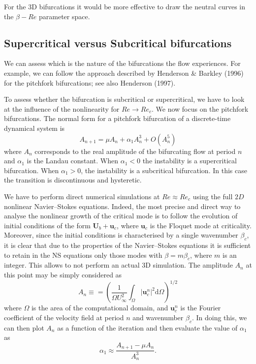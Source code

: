 \documentclass[onecolumn,notitlepage,superscriptaddress, amsmath,amssymb,longbibliographyaps,floatfix]{revtex4-1}
\begin{document}
For the 3D bifurcations it would be more effective to draw the neutral curves in the $\beta-Re$ parameter space.


\subsection{Supercritical versus Subcritical bifurcations}

We can assess which is the nature of the bifurcations the flow experiences. For example, we can follow the approach described by Henderson \& Barkley (1996) for the pitchfork bifurcations; see also Henderson (1997).

To assess whether the bifurcation is subcritical or supercritical, we have to look at the influence of the nonlinearity for $Re \rightarrow Re_c$. We now focus on the pitchfork bifurcations. The normal form for a pitchfork bifurcation of a discrete-time dynamical system is
%
\begin{equation}
  A_{n+1} = \mu A_n + \alpha_1 A_n^3 + O(A_n^5)
\end{equation}
%
where $A_n$ corresponds to the real amplitude of the bifurcating flow at period $n$ and $\alpha_1$ is the Landau constant. When $\alpha_1<0$ the instability is a supercritical bifurcation. When $\alpha_1>0$, the instability is a subcritical bifurcation. In this case the transition is discontinuous and hysteretic.

We have to perform direct numerical simulations at $Re \approx Re_c$ using the full $2D$ nonlinear Navier--Stokes equations. Indeed, the most precise and direct way to analyse the nonlinear growth of the critical mode is to follow the evolution of initial conditions of the form $\bm{U}_b + \bm{u}_c$, where $\bm{u}_c$ is the Floquet mode at criticality. Moreover, since the initial conditions is characterised by a single wavenumber $\beta_c$, it is clear that due to the properties of the Navier--Stokes equations it is sufficient to retain in the NS equations only those modes with $\beta = m \beta_c$, where $m$ is an integer. This allows to not perform an actual 3D simulation.
The amplitude $A_n$ at this point may be simply considered as
%
\begin{equation}
  A_n \equiv =  \left( \frac{1}{\Omega U_\infty^2} \int_{\Omega} |\bm{u}^n_c|^2 \text{d} \Omega \right)^{1/2}
\end{equation}
%
where $\Omega$ is the area of the computational domain, and $\bm{u}^n_c$ is the Fourier coefficient of the velocity field at period $n$ and wavenumber $\beta_c$. In doing this, we can then plot $A_n$ as a function of the iteration and then evaluate the value of $\alpha_1$ as
%
\begin{equation}
  \alpha_1 \approx \frac{ A_{n+1} - \mu A_n}{A_n^3}.
\end{equation}
%
\end{document}
